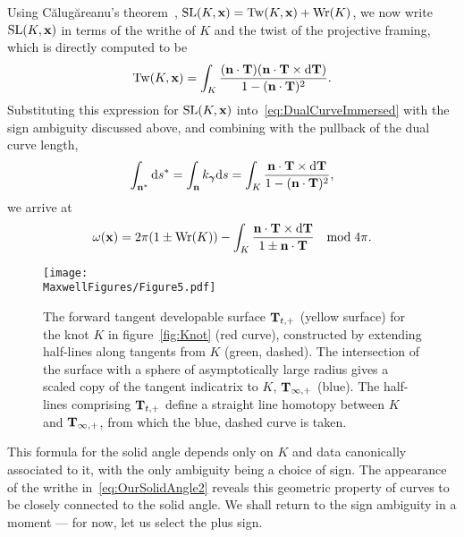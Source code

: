     Using C\u{a}lug\u{a}reanu's theorem~\citep{Calugareanu1959,Calugareanu1961}, $ \mathrm{SL}(K,{\bf x}) = \mathrm{Tw}(K,{\bf x}) +\mathrm{Wr}(K)$, we now write $ \mathrm{SL}(K,{\bf x})$ in terms of the writhe of $K$ and the twist of the projective framing, which is directly computed to be 
    \begin{equation}
        \mathrm{Tw}(K,{\bf x}) = \int_K  \frac{ ( {\bf n} \cdot {\bf T} ) ({\bf n} \cdot {\bf T} \times \mathrm{d}{\bf T}) }{1 - ({\bf n} \cdot {\bf T})^2} . 
        \label{eq:Twist}
    \end{equation}
    Substituting this expression for $\mathrm{SL}(K,{\bf x})$ into~\eqref{eq:DualCurveImmersed} with the sign ambiguity discussed above, and combining with the pullback of the dual curve length,
    \begin{equation}
        \int_{{\bf n ^*}} \mathrm{d} s^* = \int_{{\bf n}} k_{\bf \boldsymbol \gamma } \mathrm{d} s = \int_K  \frac{ {\bf n} \cdot {\bf T} \times \mathrm{d}{\bf T} }{1 - ({\bf n} \cdot {\bf T})^2},
        \label{eq:geodesicpullback1}
    \end{equation}
    we arrive at
    \begin{equation}
        \omega({\bf x}) = 2 \pi(1 \pm \mathrm{Wr}(K)) - \int_K  \frac{ {\bf n} \cdot {\bf T} \times \mathrm{d}{\bf T} }{1 \pm {\bf n} \cdot {\bf T}}  \quad \mathrm{mod}\; 4\pi .
        \label{eq:OurSolidAngle2}
    \end{equation}    
    \begin{figure}[t]
        \begin{centering}
            \texttt{[image: \\MaxwellFigures/Figure5.pdf]}
            \caption{The forward tangent developable surface ${\bf{T}}_{t,+}$ (yellow surface) for the knot $K$ in figure~\ref{fig:Knot} (red curve), constructed by extending half-lines along tangents from $K$ (green, dashed). The intersection of the surface with a sphere of asymptotically large radius gives a scaled copy of the tangent indicatrix to $K$, ${\bf T}_{\infty,+}$ (blue). The half-lines comprising ${\bf T}_{t,+}$ define a straight line homotopy between $K$ and ${\bf T}_{\infty,+}$, from which the blue, dashed curve is taken.}
            \label{fig:TangentDevelopable}
        \end{centering}
    \end{figure}
    This formula for the solid angle depends only on $K$ and data canonically associated to it, with the only ambiguity being a choice of sign. The appearance of the writhe in~\eqref{eq:OurSolidAngle2} reveals this geometric property of curves to be closely connected to the solid angle. We shall return to the sign ambiguity in a moment --- for now, let us select the plus sign. 

